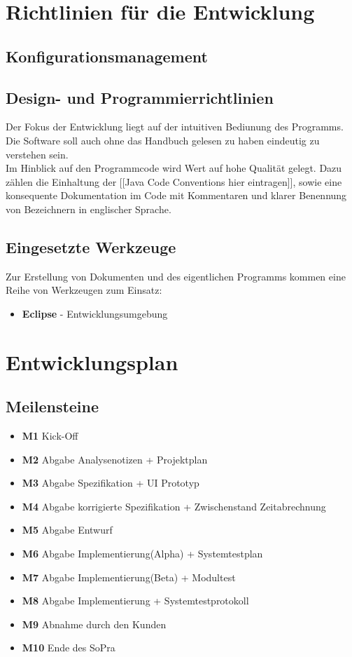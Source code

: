 \documentclass[11pt]{article}
\begin{document}
\section{Richtlinien für die Entwicklung}

\subsection{Konfigurationsmanagement}

\subsection{Design- und Programmierrichtlinien}

Der Fokus der Entwicklung liegt auf der intuitiven Bediunung des Programms. Die Software soll auch ohne das Handbuch gelesen zu haben eindeutig zu verstehen sein.\\
Im Hinblick auf den Programmcode wird Wert auf hohe Qualität gelegt. Dazu zählen die Einhaltung der [[Java Code Conventions hier eintragen]], sowie eine konsequente Dokumentation im Code mit Kommentaren und klarer Benennung von Bezeichnern in englischer Sprache.

\subsection{Eingesetzte Werkzeuge}

Zur Erstellung von Dokumenten und des eigentlichen Programms kommen eine Reihe von Werkzeugen zum Einsatz:

\begin{itemize}
	\item \textbf{Eclipse} - Entwicklungsumgebung
\end{itemize}

\section{Entwicklungsplan}

\subsection{Meilensteine}

\begin{itemize}
	\item \textbf{M1} Kick-Off
	\item \textbf{M2} Abgabe Analysenotizen + Projektplan
	\item \textbf{M3} Abgabe Spezifikation + UI Prototyp
	\item \textbf{M4} Abgabe korrigierte Spezifikation + Zwischenstand 							Zeitabrechnung
	\item \textbf{M5} Abgabe Entwurf
	\item \textbf{M6} Abgabe Implementierung(Alpha) + Systemtestplan
	\item \textbf{M7} Abgabe Implementierung(Beta) + Modultest
	\item \textbf{M8} Abgabe Implementierung + Systemtestprotokoll
	\item \textbf{M9} Abnahme durch den Kunden
	\item \textbf{M10} Ende des SoPra
\end{itemize}
\end{document}
